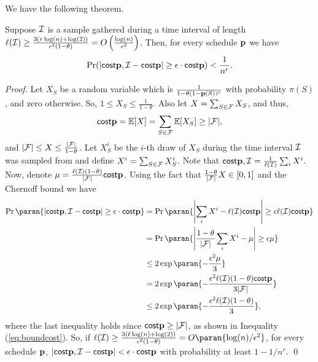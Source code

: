 	We have the following theorem.
	\begin{theorem}\label{thm:chernoffcost}
	Suppose $\mathcal{I}$ is a sample gathered during a time interval of length $\ell(\mathcal{I})
	\geq \frac{3(r\log(n)+\log(2))}{\epsilon^2(1-\theta)} =
	O\left(\frac{\log(n)}{\epsilon^2}\right)$. Then, for every schedule $\mathbf{p}$ we have
	$$\Pr(|\mathsf{cost}{\mathbf{p},\mathcal{I}} - \mathsf{cost}{\mathbf{p}}|\geq \epsilon\cdot\mathsf{cost}{\mathbf{p}}) < \frac{1}{n^r}.$$
	\end{theorem}
	\begin{proof}
	Let $X_S$ be a random variable which is $\frac{1}{1-\theta(1-\mathbf{p}(S))^c}$ with probability $\pi(S)$, and zero otherwise. So, $1\leq X_S \leq \frac{1}{1-\theta}$. Also let  $X = \sum_{S\in \mathcal{F}} X_S$, and thus,
	\begin{equation}\label{eq:boundcost}
		\mathsf{cost}{\mathbf{p}} = \mathbb{E}[X] = \sum_{S\in\mathcal{F}} \mathbb{E}[X_{S}] \geq |\mathcal{F}|,
\end{equation}
and $|\mathcal{F}| \leq X \leq \frac{|\mathcal{F}|}{1-\theta}$. Let $X^i_S$ be the $i$-th draw of $X_S$ during the time interval $\mathcal{I}$ was sampled from and define $X^i = \sum_{S\in\mathcal{F}}X_S^i$. Note that
$\mathsf{cost}{\mathbf{p},\mathcal{I}} = \frac{1}{\ell(\mathcal{I})}\sum_{i}X^i$. Now, denote $\mu=\frac{\ell(\mathcal{I})(1-\theta)}{|\mathcal{F}|}\mathsf{cost}{\mathbf{p}}$. Using the fact that $\frac{1-\theta}{|\mathcal{F}|}X \in [0,1]$ and the Chernoff bound we have
\begin{align*}
\Pr\paran{\left|\cost{\sched,\Sample} - \cost{\sched}\right| \geq \epsilon \cdot \cost{\sched}}
&=
\Pr\paran{\left|\sum_i X^i - \ell(\Sample)\cost{\sched}\right| \geq \epsilon \ell(\Sample) \cost{\sched}} \\
&=
\Pr\paran{\left|\frac{1-\theta}{|\family|}\sum_i X^i - \mu\right| \geq \epsilon \mu} \\
&\leq 2\exp\paran{-\frac{\epsilon^2\mu}{3}}\\
&=
2\exp\paran{-\frac{\epsilon^2 \ell(\Sample) (1-\theta) \cost{\sched}}{3|\family|}} \\
&\leq
2\exp\paran{-\frac{\epsilon^2 \ell(\Sample) (1-\theta)}{3}},
\end{align*}
where the last inequality holds since $\mathsf{cost}{\mathbf{p}}\geq |\mathcal{F}|$, as shown in Inequality (\ref{eq:boundcost}).
So, if $\ell(\Sample) \geq \frac{3 (\ell \log(n)+\log(2))}{\epsilon^2(1-\theta)} = O\paran{\log(n)/\epsilon^2}$, for every schedule $\mathbf{p}$, $\left|\mathsf{cost}{\mathbf{p},\mathcal{I}} - \mathsf{cost}{\mathbf{p}}\right| < \epsilon \cdot \mathsf{cost}{\mathbf{p}}$ with probability at least $1-1/n^r$.
\qed
\end{proof}

